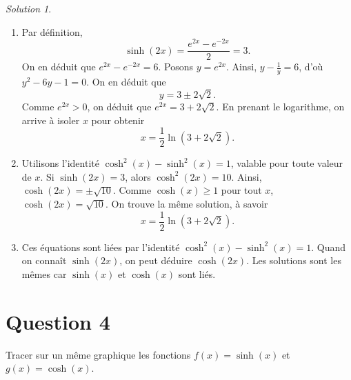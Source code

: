 \documentclass[
  12pt,
  letterpaper,
]{book}
\theoremstyle{remark}
\newtheorem*{solution}{Solution}
\begin{document}
\begin{solution}

\begin{enumerate}
\item
  Par définition, \[\sinh(2x) = \dfrac{e^{2x} - e^{-2x}}{2} = 3.\] On en
  déduit que \(e^{2x} - e^{-2x} = 6\). Posons \(y = e^{2x}\). Ainsi,
  \(y - \frac{1}{y} = 6\), d'où \(y^2 - 6y - 1 = 0\). On en déduit que
  \[y = 3\pm 2\sqrt{2}.\] Comme \(e^{2x} > 0\), on déduit que
  \(e^{2x} = 3 + 2\sqrt{2}\). En prenant le logarithme, on arrive à
  isoler \(x\) pour obtenir
  \[x = \frac{1}{2}\ln\left(3 + 2\sqrt{2}\right).\]
\item
  Utilisons l'identité \(\cosh^2(x) - \sinh^2(x) = 1\), valable pour
  toute valeur de \(x\). Si \(\sinh(2x) = 3\), alors
  \(\cosh^2(2x) = 10\). Ainsi, \(\cosh(2x) = \pm\sqrt{10}\). Comme
  \(\cosh(x) \geq 1\) pour tout \(x\), \(\cosh(2x) = \sqrt{10}\). On
  trouve la même solution, à savoir
  \[x = \frac{1}{2}\ln\left(3 + 2\sqrt{2}\right).\]
\item
  Ces équations sont liées par l'identité
  \(\cosh^2(x) - \sinh^2(x) = 1\). Quand on connaît \(\sinh(2x)\), on
  peut déduire \(\cosh(2x)\). Les solutions sont les mêmes car
  \(\sinh(x)\) et \(\cosh(x)\) sont liés.
\end{enumerate}

\end{solution}

\hypertarget{question-4-3}{%
\section{Question 4}\label{question-4-3}}

Tracer sur un même graphique les fonctions \(f(x) = \sinh(x)\) et
\(g(x) = \cosh(x)\).
\end{document}
